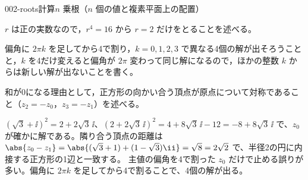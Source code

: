 \documentclass[uplatex,dvipdfmx,a4paper,11pt]{jsarticle}
\begin{document}
\begin{mondai}{002-roots}{計算}{$n$ 乗根（$n$ 個の値と複素平面上の配置）}
\begin{tadashii}
\begin{ronten}
  \item {} $r$ は正の実数なので，$r^{4}=16$ から $r=2$ だけをとることを述べる。
  \item {} 偏角に $2\pi k$ を足してから4で割り，$k=0,1,2,3$ で異なる4個の解が出そろうことと，$k$ を4だけ変えると偏角が $2\pi$ 変わって同じ解になるので，ほかの整数 $k$ からは新しい解が出ないことを書く。
  \item {} 和が0になる理由として，正方形の向かい合う頂点が原点について対称であること（$z_{2}=-z_{0}$，$z_{3}=-z_{1}$）を述べる。
\end{ronten}
\kenzan $(\sqrt{3}+\ii)^{2}=2+2\sqrt{3}\,\ii$、$(2+2\sqrt{3}\,\ii)^{2}=4+8\sqrt{3}\,\ii-12=-8+8\sqrt{3}\,\ii$ で、$z_{0}$ が確かに解である。隣り合う頂点の距離は $\abs{z_{0}-z_{1}}=\abs{(\sqrt{3}+1)+(1-\sqrt{3})\ii}=\sqrt{8}=2\sqrt{2}$ で、半径2の円に内接する正方形の1辺と一致する。
\tsumazuki 主値の偏角を4で割った $z_{0}$ だけで止める誤りが多い。偏角に $2\pi k$ を足してから4で割ることで、4個の解が出る。
\end{tadashii}
\end{mondai}
\end{document}
